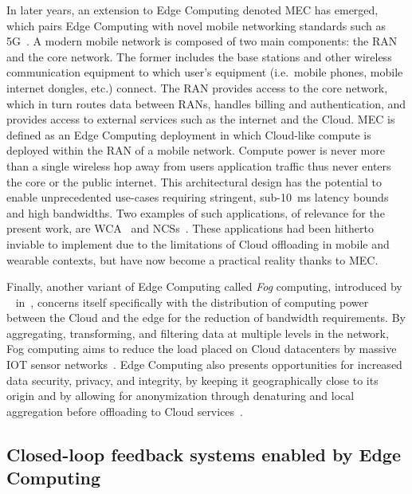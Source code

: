 %
%
In later years, an extension to Edge Computing denoted \gls{MEC} has emerged, which pairs Edge Computing with novel mobile networking standards such as 5G~\cite{hassan2019edge,pham2020survey,wan2020efficient}.
A modern mobile network is composed of two main components: the \gls{RAN} and the core network.
The former includes the base stations and other wireless communication equipment to which user's equipment (i.e.\ mobile phones, mobile internet dongles, etc.) connect. 
The \gls{RAN} provides access to the core network, which in turn routes data between \glspl{RAN}, handles billing and authentication, and provides access to external services such as the internet and the Cloud.
\gls{MEC} is defined as an Edge Computing deployment in which Cloud-like compute is deployed within the \gls{RAN} of a mobile network.
Compute power is never more than a single wireless hop away from users application traffic thus never enters the core or the public internet.
This architectural design has the potential to enable unprecedented use-cases requiring stringent, sub-\SI{10}{\milli\second} latency bounds and high bandwidths.
Two examples of such applications, of relevance for the present work, are \acl{WCA}~\cite{ha2014towards,chen2018application,wang2020scaling,chen2017empirical,chen2018application} and \aclp{NCS}~\cite{sasaki2016vehicle,wang2018bandwidth,wan2020efficient}.
These applications had been hitherto inviable to implement due to the limitations of Cloud offloading in mobile and wearable contexts, but have now become a practical reality thanks to \gls{MEC}.

Finally, another variant of Edge Computing called \emph{Fog} computing, introduced by \citeauthor{bonomi2012fog}~\cite{bonomi2012fog} in\ \citeyear{bonomi2012fog}, concerns itself specifically with the distribution of computing power between the Cloud and the edge for the reduction of bandwidth requirements.
By aggregating, transforming, and filtering data at multiple levels in the network, Fog computing aims to reduce the load placed on Cloud datacenters by massive \gls{IOT} sensor networks~\cite{yi2015survey}.
Edge Computing also presents opportunities for increased data security, privacy, and integrity, by keeping it geographically close to its origin and by allowing for anonymization through denaturing and local aggregation before offloading to Cloud services~\cite{satyanarayanan2017emergence}.

\subsection{Closed-loop feedback systems enabled by Edge Computing}

